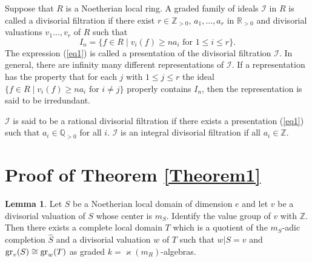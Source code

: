 \documentclass[11pt]{amsart}
\def\NZQ{\mathbb}               %
\def\QQ{{\NZQ Q}}
\def\ZZ{{\NZQ Z}}
\def\RR{{\NZQ R}}
\theoremstyle{definition}
\newtheorem{Lemma}[Theorem]{Lemma}
\let\kappa=\varkappa
\begin{document}
 Suppose that $R$ is a Noetherian local ring. A graded family of ideals $\mathcal I$ in $R$ is called a divisorial filtration if there exist $r\in\ZZ_{>0}$, $a_1,\ldots, a_r$ in $\RR_{>0}$ and divisorial valuations $v_1\ldots,v_r$ of $R$ such that
\begin{equation}\label{eq1}
I_n=\{f\in R\mid v_i(f)\ge n a_i\mbox{ for }1\le i\le r\}.
\end{equation}
The expression (\ref{eq1}) is called a presentation of the divisorial filtration $\mathcal I$. In general, there are infinity many different representations of $\mathcal I$. If a representation has the property that for each $j$ with $1\le j\le r$ the ideal $\{f\in R\mid v_i(f)\ge n a_i\mbox{ for }i\ne j\}$ properly contains $I_n$, then the representation is said to be irredundant. 

$\mathcal I$ is said to be a rational divisorial filtration if there exists a   presentation (\ref{eq1})  such that $a_i\in \QQ_{>0}$ for all $i$. $\mathcal I$ is an integral divisorial filtration if all $a_i\in \ZZ$.


\section{Proof of Theorem \ref{Theorem1}}\label{SecThm1} 

\begin{Lemma}\label{Lemma1} Let $S$ be a Noetherian local domain of dimension $e$ and let $v$ be a divisorial valuation of $S$ whose center is $m_S$.
Identify the value group of $v$ with $\ZZ$. Then there exists a complete local domain $T$ which is a quotient of the $m_S$-adic completion $\hat S$ and a divisorial valuation $w$ of $T$ such that $w| S=v$ and ${\rm gr}_v(S)\cong {\rm gr}_w(T)$ as graded $k=\kappa(m_R)$-algebras.
\end{Lemma}
\end{document}
